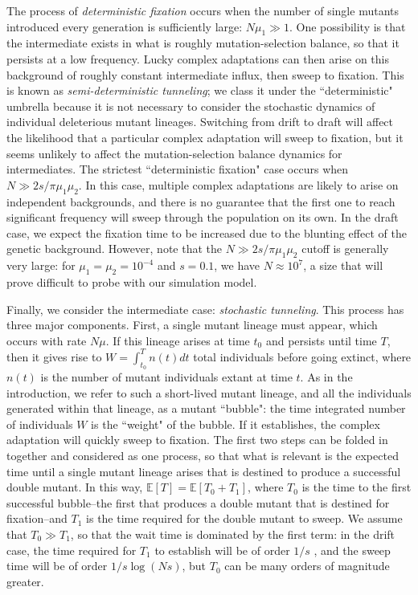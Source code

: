 \documentclass[10pt,twocolumn,twoside]{gsajnl}
\begin{document}
\begin{spacing}{1.5}
The process of \emph{deterministic fixation} occurs when the number of single mutants introduced every generation is sufficiently large: $N\mu_1 \gg 1$.
One possibility is that the intermediate exists in what is roughly mutation-selection balance, so that it persists at a low frequency.
Lucky complex adaptations can then arise on this background of roughly constant intermediate influx, then sweep to fixation.
This is known as \emph{semi-deterministic tunneling}; we class it under the ``deterministic" umbrella because it is not necessary to consider the stochastic dynamics of individual deleterious mutant lineages.
Switching from drift to draft will affect the likelihood that a particular complex adaptation will sweep to fixation, but it seems unlikely to affect the mutation-selection balance dynamics for intermediates.
The strictest ``deterministic fixation" case occurs when $N \gg 2s/\pi \mu_1 \mu_2$.
In this case, multiple complex adaptations are likely to arise on independent backgrounds, and there is no guarantee that the first one to reach significant frequency will sweep through the population on its own.
In the draft case, we expect the fixation time to be increased due to the blunting effect of the genetic background.
However, note that the $N \gg 2s/\pi \mu_1 \mu_2$ cutoff is generally very large: for $\mu_1 = \mu_2 = 10^{-4}$ and $s = 0.1$, we have $N \approx 10^7$, a size that will prove difficult to probe with our simulation model.

Finally, we consider the intermediate case: \emph{stochastic tunneling}.
This process has three major components.
First, a single mutant lineage must appear, which occurs with rate $N\mu$.
If this lineage arises at time $t_0$ and persists until time $T$, then it gives rise to $W = \int_{t_0}^T n(t) dt$ total individuals before going extinct, where $n(t)$ is the number of mutant individuals extant at time $t$.
As in the introduction, we refer to such a short-lived mutant lineage, and all the individuals generated within that lineage, as a mutant ``bubble": the time integrated number of individuals $W$ is the ``weight" of the bubble.
If it establishes, the complex adaptation will quickly sweep to fixation.
The first two steps can be folded in together and considered as one process, so that what is relevant is the expected time until a single mutant lineage arises that is destined to produce a successful double mutant.
In this way, $\mathbb{E}\left[ T \right] = \mathbb{E} \left[ T_0 + T_1 \right]$, where $T_0$ is the time to the first successful bubble--the first that produces a double mutant that is destined for fixation--and $T_1$ is the time required for the double mutant to sweep.
We assume that $T_0 \gg T_1$, so that the wait time is dominated by the first term: in the drift case, the time required for $T_1$ to establish will be of order $1/s$ \citep{desai_fisher_2007}, and the sweep time will be of order $1/s \log (Ns)$, but $T_0$ can be many orders of magnitude greater.


\end{spacing}
\end{document}
